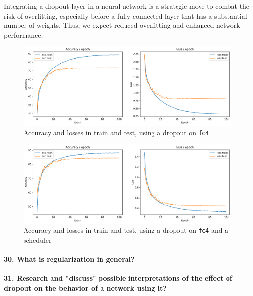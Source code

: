 \documentclass{article}
\theoremstyle{plain}%
\theoremstyle{definition}
\theoremstyle{remark}
\begin{document}
Integrating a dropout layer in a neural network is a strategic move to combat the risk of overfitting, especially before a fully connected layer that has a substantial number of weights. Thus, we expect reduced overfitting and enhanced network performance.

\begin{figure}[H]
    \centering
    \includegraphics*[width=\textwidth]{figs/CNN/dropout.pdf}
    \caption{Accuracy and losses in train and test, using a dropout on \texttt{fc4}}
    \label{fig:dropout}
\end{figure}

\begin{figure}[H]
    \centering
    \includegraphics*[width=\textwidth]{figs/CNN/dropout_with_scheduler.pdf}
    \caption{Accuracy and losses in train and test, using a dropout on \texttt{fc4} and a scheduler}
    \label{fig:dropout_with_scheduler}
\end{figure}

\paragraph{30. What is regularization in general?}

\paragraph{31. Research and "discuss" possible interpretations of the effect of dropout on the behavior of a network using it?}
\end{document}
